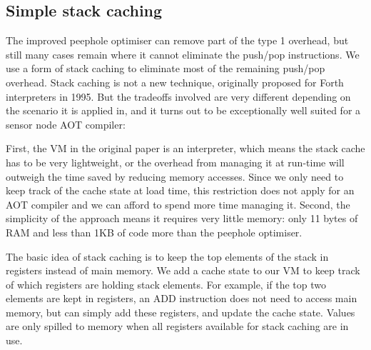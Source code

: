 
\subsection{Simple stack caching}
\label{sec-optimisations-simple-stack-caching}

The improved peephole optimiser can remove part of the type 1 overhead, but still many cases remain where it cannot eliminate the push/pop instructions. We use a form of stack caching \cite{Ertl:1995dv} to eliminate most of the remaining push/pop overhead. Stack caching is not a new technique, originally proposed for Forth interpreters in 1995. But the tradeoffs involved are very different depending on the scenario it is applied in, and it turns out to be exceptionally well suited for a sensor node AOT compiler:

First, the VM in the original paper is an interpreter, which means the stack cache has to be very lightweight, or the overhead from managing it at run-time will outweigh the time saved by reducing memory accesses. Since we only need to keep track of the cache state at load time, this restriction does not apply for an AOT compiler and we can afford to spend more time managing it. Second, the simplicity of the approach means it requires very little memory: only 11 bytes of RAM and less than 1KB of code more than the peephole optimiser.

The basic idea of stack caching is to keep the top elements of the stack in registers instead of main memory. We add a cache state to our VM to keep track of which registers are holding stack elements. For example, if the top two elements are kept in registers, an ADD instruction does not need to access main memory, but can simply add these registers, and update the cache state. Values are only spilled to memory when all registers available for stack caching are in use.

